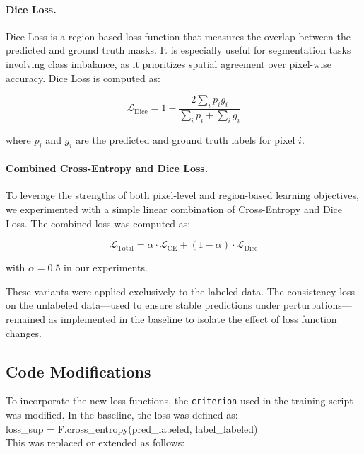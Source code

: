 \documentclass[10pt,twocolumn,letterpaper]{article}
\begin{document}
\paragraph{Dice Loss.} Dice Loss is a region-based loss function that measures the overlap between the predicted and ground truth masks. It is especially useful for segmentation tasks involving class imbalance, as it prioritizes spatial agreement over pixel-wise accuracy. Dice Loss is computed as:

\begin{equation}
\mathcal{L}_{\text{Dice}} = 1 - \frac{2 \sum_i p_i g_i}{\sum_i p_i + \sum_i g_i}
\end{equation}

where \( p_i \) and \( g_i \) are the predicted and ground truth labels for pixel \( i \).

\paragraph{Combined Cross-Entropy and Dice Loss.} To leverage the strengths of both pixel-level and region-based learning objectives, we experimented with a simple linear combination of Cross-Entropy and Dice Loss. The combined loss was computed as:

\begin{equation}
\mathcal{L}_{\text{Total}} = \alpha \cdot \mathcal{L}_{\text{CE}} + (1 - \alpha) \cdot \mathcal{L}_{\text{Dice}}
\end{equation}

with \( \alpha = 0.5 \) in our experiments.

These variants were applied exclusively to the labeled data. The consistency loss on the unlabeled data—used to ensure stable predictions under perturbations—remained as implemented in the baseline to isolate the effect of loss function changes.

\subsection{Code Modifications}

To incorporate the new loss functions, the \texttt{criterion} used in the training script was modified. In the baseline, the loss was defined as:\\

loss\_sup = F.cross\_entropy(pred\_labeled, label\_labeled)\\

This was replaced or extended as follows:
\end{document}

